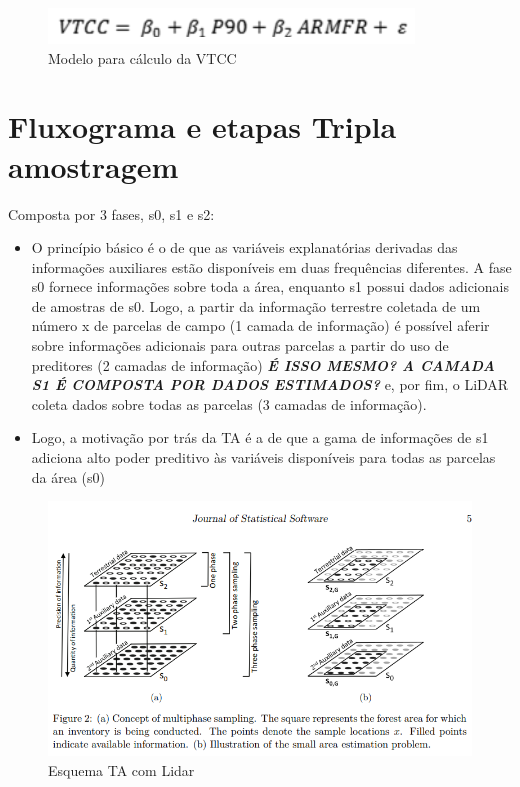 \documentclass[
]{article}
\begin{document}
\begin{figure}

{\centering \includegraphics[width=0.6\linewidth]{IMAGES/eq-estimador-regressao} 

}

\caption{Modelo para cálculo da VTCC}\label{fig:unnamed-chunk-20}
\end{figure}

\newpage

\section{Fluxograma e etapas Tripla
amostragem}\label{fluxograma-e-etapas-tripla-amostragem}

Composta por 3 fases, s0, s1 e s2:

\begin{itemize}
\item
  O princípio básico é o de que as variáveis explanatórias derivadas das
  informações auxiliares estão disponíveis em duas frequências
  diferentes. A fase s0 fornece informações sobre toda a área, enquanto
  s1 possui dados adicionais de amostras de s0. Logo, a partir da
  informação terrestre coletada de um número x de parcelas de campo (1
  camada de informação) é possível aferir sobre informações adicionais
  para outras parcelas a partir do uso de preditores (2 camadas de
  informação) \textbf{\emph{É ISSO MESMO? A CAMADA S1 É COMPOSTA POR
  DADOS ESTIMADOS?}} e, por fim, o LiDAR coleta dados sobre todas as
  parcelas (3 camadas de informação).
\item
  Logo, a motivação por trás da TA é a de que a gama de informações de
  s1 adiciona alto poder preditivo às variáveis disponíveis para todas
  as parcelas da área (s0)
\end{itemize}

\begin{figure}

{\centering \includegraphics[width=0.5\linewidth]{IMAGES/esquematizacao-TA} 

}

\caption{Esquema TA com Lidar}\label{fig:unnamed-chunk-21}
\end{figure}
\end{document}

